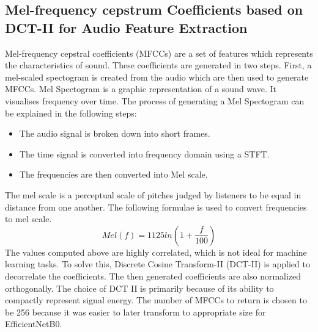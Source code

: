 \documentclass[fleqn, 10pt, twoside]{IOEGC}
\begin{document}
\subsection{Mel-frequency cepstrum Coefficients based on DCT-II for Audio Feature Extraction
}
Mel-frequency cepstral coefficients (MFCCs) are a set of features which represents the characteristics of sound.\cite{r9} These coefficients are generated in two steps. First, a mel-scaled spectogram is created from the audio which are then used to generate MFCCs.
Mel Spectogram is a graphic representation of a sound wave. It visualises frequency over time. The process of generating a Mel Spectogram can be explained in the following steps:
\begin{itemize}
	\item {The audio signal is broken down into short frames.}
	\item {The time signal is converted into frequency domain using a STFT.}
	      \item{The frequencies are then converted into Mel scale.}
\end{itemize}
The mel scale is a perceptual scale of pitches judged by listeners to be equal in distance from one another. The following formulae is used to convert frequencies to mel scale.
\[
	Mel(f)=1125ln(1+ \frac{f}{100})
\]
The values computed above are highly correlated, which is not ideal for machine learning tasks. To solve this, Discrete Cosine Transform-II (DCT-II) is applied to decorrelate the coefficients. The then generated coefficients are also normalized orthogonally. The choice of DCT II is primarily because of its ability to compactly represent signal energy. The number of MFCCs to return is chosen to be 256 because it was easier to later transform to appropriate size for EfficientNetB0.
\end{document}
